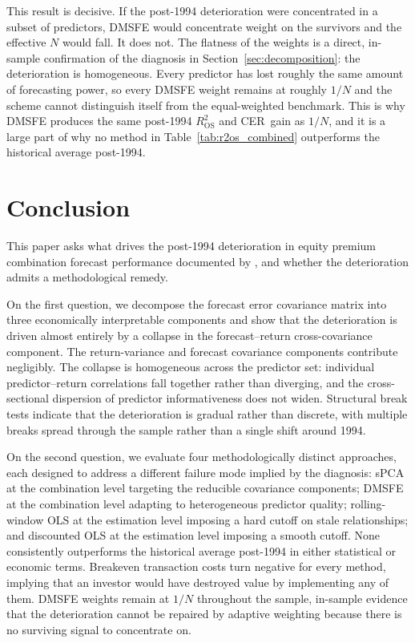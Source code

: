 \documentclass[a4paper,11pt]{article}
\begin{document}
This result is decisive. If the post-1994 deterioration were
concentrated in a subset of predictors, DMSFE would concentrate weight
on the survivors and the effective $N$ would fall. It does not. The
flatness of the weights is a direct, in-sample confirmation of the
diagnosis in Section~\ref{sec:decomposition}: the deterioration is
homogeneous. Every predictor has lost roughly the same amount of
forecasting power, so every DMSFE weight remains at roughly $1/N$ and the
scheme cannot distinguish itself from the equal-weighted benchmark. This
is why DMSFE produces the same post-1994 $R^2_{\mathrm{OS}}$ and
CER~gain as $1/N$, and it is a large part of why no method in
Table~\ref{tab:r2os_combined} outperforms the historical average
post-1994.

\section{Conclusion}\label{sec:conclusion}

This paper asks what drives the post-1994 deterioration in equity
premium combination forecast performance documented by
\citet{denkloffler2024}, and whether the deterioration admits a
methodological remedy.

On the first question, we decompose the forecast error covariance matrix
into three economically interpretable components and show that the
deterioration is driven almost entirely by a collapse in the
forecast--return cross-covariance component. The return-variance and
forecast covariance components contribute negligibly. The collapse is
homogeneous across the predictor set: individual predictor--return
correlations fall together rather than diverging, and the cross-sectional
dispersion of predictor informativeness does not widen. Structural break
tests indicate that the deterioration is gradual rather than discrete,
with multiple breaks spread through the sample rather than a single
shift around 1994.

On the second question, we evaluate four methodologically distinct
approaches, each designed to address a different failure mode implied by
the diagnosis: sPCA at the combination level targeting the reducible
covariance components; DMSFE at the combination level adapting to
heterogeneous predictor quality; rolling-window OLS at the estimation
level imposing a hard cutoff on stale relationships; and discounted OLS
at the estimation level imposing a smooth cutoff. None consistently
outperforms the historical average post-1994 in either statistical or
economic terms. Breakeven transaction costs turn negative for every
method, implying that an investor would have destroyed value by
implementing any of them. DMSFE weights remain at $1/N$ throughout the
sample, in-sample evidence that the deterioration cannot be repaired by
adaptive weighting because there is no surviving signal to concentrate
on.
\end{document}
